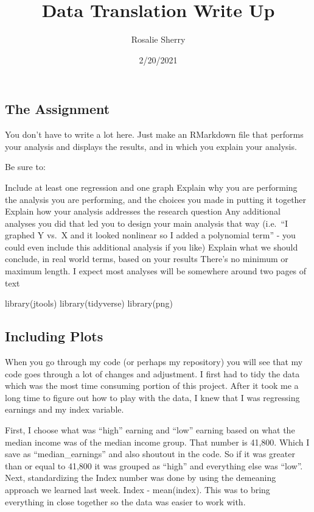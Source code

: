 \documentclass[
]{article}
\title{Data Translation Write Up}
\author{Rosalie Sherry}
\date{2/20/2021}
\begin{document}
\maketitle

\hypertarget{the-assignment}{%
\subsection{The Assignment}\label{the-assignment}}

You don't have to write a lot here. Just make an RMarkdown file that
performs your analysis and displays the results, and in which you
explain your analysis.

Be sure to:

Include at least one regression and one graph Explain why you are
performing the analysis you are performing, and the choices you made in
putting it together Explain how your analysis addresses the research
question Any additional analyses you did that led you to design your
main analysis that way (i.e.~``I graphed Y vs.~X and it looked nonlinear
so I added a polynomial term'' - you could even include this additional
analysis if you like) Explain what we should conclude, in real world
terms, based on your results There's no minimum or maximum length. I
expect most analyses will be somewhere around two pages of text

library(jtools) library(tidyverse) library(png)

\hypertarget{including-plots}{%
\subsection{Including Plots}\label{including-plots}}

When you go through my code (or perhaps my repository) you will see that
my code goes through a lot of changes and adjustment. I first had to
tidy the data which was the most time consuming portion of this project.
After it took me a long time to figure out how to play with the data, I
knew that I was regressing earnings and my index variable.

First, I choose what was ``high'' earning and ``low'' earning based on
what the median income was of the median income group. That number is
41,800. Which I save as ``median\_earnings'' and also shoutout in the
code. So if it was greater than or equal to 41,800 it was grouped as
``high'' and everything else was ``low''. Next, standardizing the Index
number was done by using the demeaning approach we learned last week.
Index - mean(index). This was to bring everything in close together so
the data was easier to work with.
\end{document}

